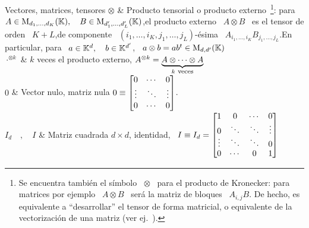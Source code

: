 \begin{notation}{Vectores, matrices, tensores}
%
$\otimes$  &  Producto   tensorial  o  producto  externo~\footnote{Se  encuentra
  tambi\'en  el s\'imbolo  \ $\otimes$  \ para  el producto  de  Kronecker: para
  matrices por ejemplo \ $A \otimes B$  \ ser\'a la matriz de bloques \
  $A_{i,j}  B$. De hecho,  es equivalente  a ``desarrollar''  el tensor  de forma
  matricial,   o  equivalente  de   la  vectorizaci\'on   de  una   matriz  (ver
  ej.~\cite{MagNeu79}).}:  para $A \in  \mathrm{M}_{d_1,\ldots,d_K}(\mathbb{K}), \quad  B \in
\mathrm{M}_{d'_1,\ldots,d'_L}(\mathbb{K})$,\newline  el producto  externo \ $A  \otimes B$ \  es el
tensor      de      orden      \      $K+L$,\newline         de      componente      \
$(i_1,\ldots,i_K,j_1,\ldots,j_L)$-\'esima          \         $A_{i_1,\ldots,i_K}
B_{j_1,\ldots,j_L} $.\vspace{1mm}\newline En particular, para \ $a \in \mathbb{K}^d, \quad
b \in \mathbb{K}^{d'}$, \ $a \otimes b = a b^t \in \mathrm{M}_{d,d'}(\mathbb{K})$\\[2.5mm]
\hline
%
$\cdot^{\otimes k}$ & $k$ veces el producto externo, $A^{\otimes k}
= \underbrace{A \otimes \cdots \otimes A}_{k \:\, \mbox{\footnotesize
veces}}$\\[2.5mm]
\hline
%
$0$ &  Vector nulo, matriz nula
$0 \equiv \protect\begin{bmatrix}
   0   & \cdots &    0   \\
\vdots & \ddots & \vdots \\
   0   & \cdots &    0
\protect\end{bmatrix}$.\vspace{1mm}\\[2.5mm]
\hline
%
$I_d \quad , \quad I$ & Matriz cuadrada $d \times d$, identidad, \ $I \equiv I_d
= \protect\begin{bmatrix}
   1   &    0   & \cdots &   0    \\[-.25mm]
   0   & \ddots & \ddots & \vdots \\[-1mm]
\vdots & \ddots & \ddots &   0    \\[-.25mm]
   0   & \cdots &    0   &   1
\protect\end{bmatrix}$

\end{notation}
